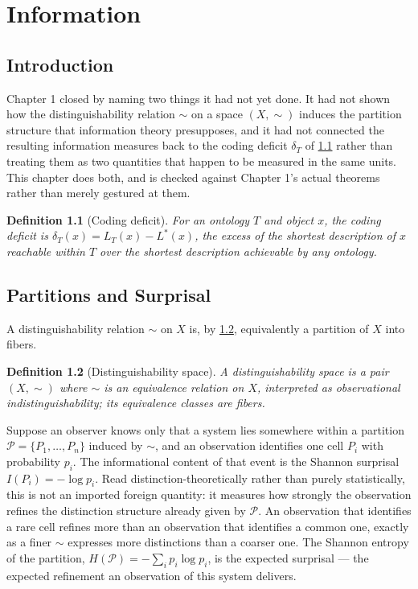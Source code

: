\documentclass[12pt]{report}
\newtheorem{definition}{Definition}[section]
\begin{document}
\chapter{Information}

\section{Introduction}

Chapter 1 closed by naming two things it had not yet done. It had not
shown how the distinguishability relation $\sim$ on a space $(X,\sim)$
induces the partition structure that information theory presupposes, and
it had not connected the resulting information measures back to the
coding deficit $\delta_T$ of \cref{def:coding-deficit-recall-info} rather than
treating them as two quantities that happen to be measured in the same
units. This chapter does both, and is checked against Chapter 1's actual
theorems rather than merely gestured at them.

\begin{definition}[Coding deficit]
\label{def:coding-deficit-recall-info}
For an ontology $T$ and object $x$, the coding deficit is
$\delta_T(x) = L_T(x) - L^*(x)$, the excess of the shortest description
of $x$ reachable within $T$ over the shortest description achievable by
any ontology.
\end{definition}

\section{Partitions and Surprisal}
\label{sec:surprisal}

A distinguishability relation $\sim$ on $X$ is, by
\cref{def:dist-space-recall}, equivalently a partition of $X$ into fibers.

\begin{definition}[Distinguishability space]
\label{def:dist-space-recall}
A distinguishability space is a pair $(X,\sim)$ where $\sim$ is an
equivalence relation on $X$, interpreted as observational
indistinguishability; its equivalence classes are fibers.
\end{definition}

Suppose an observer knows only that a system lies somewhere within a
partition $\mathcal{P} = \{P_1, \ldots, P_n\}$ induced by $\sim$, and an
observation identifies one cell $P_i$ with probability $p_i$. The
informational content of that event is the Shannon surprisal
$I(P_i) = -\log p_i$. Read distinction-theoretically rather than
purely statistically, this is not an imported foreign quantity: it
measures how strongly the observation refines the distinction structure
already given by $\mathcal{P}$. An observation that identifies a rare
cell refines more than an observation that identifies a common one,
exactly as a finer $\sim$ expresses more distinctions than a coarser one.
The Shannon entropy of the partition, $H(\mathcal{P}) =
-\sum_i p_i \log p_i$, is the expected surprisal --- the expected
refinement an observation of this system delivers.
\end{document}
